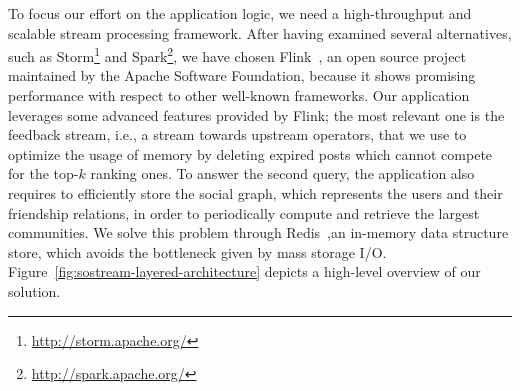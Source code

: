 To focus our effort on the application logic, we need a high-throughput and scalable stream processing framework.  
%
After having examined several alternatives, such as Storm\footnote{\url{http://storm.apache.org/}} and Spark\footnote{\url{http://spark.apache.org/}}, we have chosen Flink~\cite{Flink}, an open source project maintained by the Apache Software Foundation, because it shows promising performance with respect to other well-known frameworks.
%
Our application leverages some advanced features provided by Flink; the most relevant one is the feedback stream, i.e., a stream towards upstream operators, that we use to optimize the usage of memory by deleting expired posts which cannot compete for the top-$k$ ranking ones.
%
To answer the second query, the application also requires to efficiently store the social graph, which represents the users and their friendship relations, in order to periodically compute and retrieve the largest communities. 
%
We solve this problem through Redis~\cite{Redis},an in-memory data structure store, which avoids the bottleneck given by mass storage I/O. 
%
Figure~\ref{fig:sostream-layered-architecture} depicts a high-level overview of our solution.  
